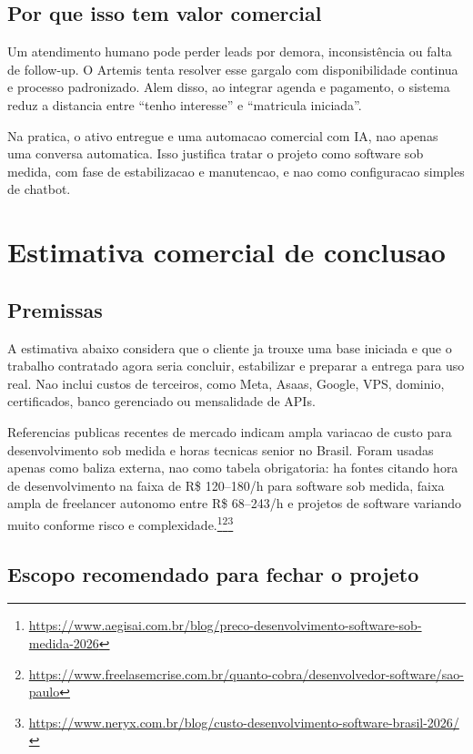 \documentclass[11pt,a4paper]{article}
\begin{document}
\subsection{Por que isso tem valor comercial}

Um atendimento humano pode perder leads por demora, inconsistência ou falta de follow-up. O Artemis tenta resolver esse gargalo com disponibilidade continua e processo padronizado. Alem disso, ao integrar agenda e pagamento, o sistema reduz a distancia entre ``tenho interesse'' e ``matricula iniciada''.

Na pratica, o ativo entregue e uma automacao comercial com IA, nao apenas uma conversa automatica. Isso justifica tratar o projeto como software sob medida, com fase de estabilizacao e manutencao, e nao como configuracao simples de chatbot.

\section{Estimativa comercial de conclusao}

\subsection{Premissas}

A estimativa abaixo considera que o cliente ja trouxe uma base iniciada e que o trabalho contratado agora seria concluir, estabilizar e preparar a entrega para uso real. Nao inclui custos de terceiros, como Meta, Asaas, Google, VPS, dominio, certificados, banco gerenciado ou mensalidade de APIs.

Referencias publicas recentes de mercado indicam ampla variacao de custo para desenvolvimento sob medida e horas tecnicas senior no Brasil. Foram usadas apenas como baliza externa, nao como tabela obrigatoria: ha fontes citando hora de desenvolvimento na faixa de R\$ 120--180/h para software sob medida, faixa ampla de freelancer autonomo entre R\$ 68--243/h e projetos de software variando muito conforme risco e complexidade.\footnote{\url{https://www.aegisai.com.br/blog/preco-desenvolvimento-software-sob-medida-2026}}\footnote{\url{https://www.freelasemcrise.com.br/quanto-cobra/desenvolvedor-software/sao-paulo}}\footnote{\url{https://www.neryx.com.br/blog/custo-desenvolvimento-software-brasil-2026/}}

\subsection{Escopo recomendado para fechar o projeto}
\end{document}
